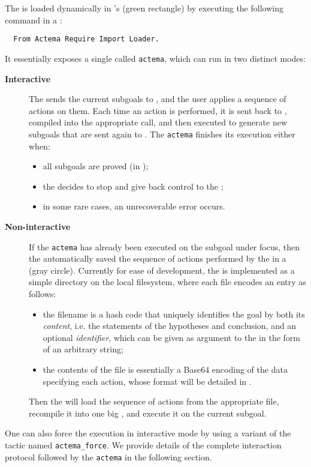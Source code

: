 The  is loaded dynamically in 's  (green
rectangle) by executing the following command in a :
\begin{verbatim}
  From Actema Require Import Loader.
\end{verbatim}
It essentially exposes a single  called \texttt{actema}, which can run in
two distinct modes:
\begin{description}
  \item[\bfseries Interactive] The  sends the current subgoals
  to , and the user applies a sequence of actions on them. Each time an
  action is performed, it is sent back to , compiled into the appropriate
   call, and then executed to generate new subgoals that are sent again to
  . The \texttt{actema}  finishes its execution either when:
  \begin{itemize}
    \item all subgoals are proved (in );
    \item the  decides to stop and give back control to the
    ;
    \item in some rare cases, an unrecoverable error occurs.
  \end{itemize}

  \item[\bfseries Non-interactive] If the \texttt{actema}  has already
  been executed on the subgoal under focus, then the 
  automatically saved the sequence of actions performed by the  in
  a  (gray circle). Currently for ease of development, the
   is implemented as a simple directory on the local
  filesystem, where each file encodes an entry as follows:
  \begin{itemize}
    \item the filename is a hash code that uniquely identifies the goal by both
    its \emph{content}, i.e. the statements of the hypotheses and conclusion,
    and an optional \emph{identifier}, which can be given as argument to the
     in the form of an arbitrary string;
    \item the contents of the file is essentially a Base64 encoding of the data
    specifying each action, whose format will be detailed in
    .
  \end{itemize}
  Then the  will load the sequence of actions from the appropriate file,
  recompile it into one big , and execute it on the current subgoal.
\end{description}
One can also force the execution in interactive mode by using a variant of the
tactic named \texttt{actema\_force}. We provide details of the complete
interaction protocol followed by the \texttt{actema}  in the following
section.

